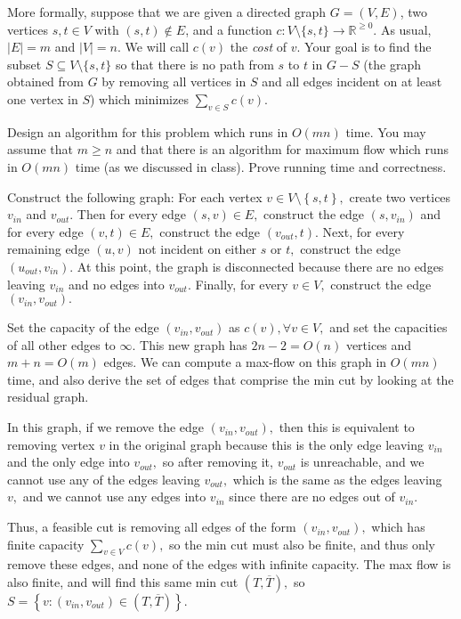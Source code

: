 \documentclass{article}
\begin{document}
More formally, suppose that we are given a directed graph $G = (V, E)$, two vertices $s,t \in V$ with $(s,t) \not\in E$, and a function $c : V \setminus \{s,t\} \rightarrow \mathbb{R}^{\geq 0}$.  As usual, $|E| = m$ and $|V| = n$.  We will call $c(v)$ the \emph{cost} of $v$.  Your goal is to find the subset $S \subseteq V \setminus \{s,t\}$ so that there is no path from $s$ to $t$ in $G - S$ (the graph obtained from $G$ by removing all vertices in $S$ and all edges incident on at least one vertex in $S$) which minimizes $\sum_{v \in S} c(v)$.  

Design an algorithm for this problem which runs in $O(mn)$ time.  You may assume that $m \geq n$ and that there is an algorithm for maximum flow which runs in $O(mn)$ time (as we discussed in class).  Prove running time and correctness.
\begin{soln}
	Construct the following graph: For each vertex $v\in V\setminus\left\{ s, t \right\},$ create two vertices $v_{in}$ and $v_{out}.$ Then for every edge $(s, v)\in E,$ construct the edge $(s, v_{in})$ and for every edge $(v, t)\in E,$ construct the edge $(v_{out}, t).$ Next, for every remaining edge $(u, v)$ not incident on either $s$ or $t,$ construct the edge $(u_{out}, v_{in}).$ At this point, the graph is disconnected because there are no edges leaving $v_{in}$ and no edges into $v_{out}.$ Finally, for every $v\in V,$ construct the edge $(v_{in}, v_{out}).$

	Set the capacity of the edge $(v_{in}, v_{out})$ as $c(v), \forall v\in V,$ and set the capacities of all other edges to $\infty.$ This new graph has $2n-2=O(n)$ vertices and $m+n=O(m)$ edges. We can compute a max-flow on this graph in $O(mn)$ time, and also derive the set of edges that comprise the min cut by looking at the residual graph.

	In this graph, if we remove the edge $(v_{in}, v_{out}),$ then this is equivalent to removing vertex $v$ in the original graph because this is the only edge leaving $v_{in}$ and the only edge into $v_{out},$ so after removing it, $v_{out}$ is unreachable, and we cannot use any of the edges leaving $v_{out},$ which is the same as the edges leaving $v,$ and we cannot use any edges into $v_{in}$ since there are no edges out of $v_{in}.$

	Thus, a feasible cut is removing all edges of the form $(v_{in}, v_{out}),$ which has finite capacity $\sum_{v\in V}^{} c(v),$ so the min cut must also be finite, and thus only remove these edges, and none of the edges with infinite capacity. The max flow is also finite, and will find this same min cut $(T, \overline T),$ so $S=\left\{ v:(v_{in}, v_{out})\in (T, \overline T)\right\}.$
\end{soln}
\end{document}
